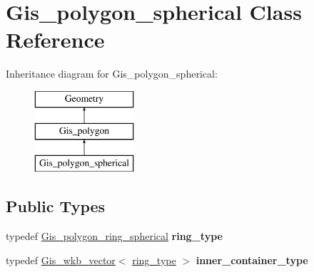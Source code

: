 \hypertarget{classGis__polygon__spherical}{}\section{Gis\+\_\+polygon\+\_\+spherical Class Reference}
\label{classGis__polygon__spherical}
Inheritance diagram for Gis\+\_\+polygon\+\_\+spherical\+:\begin{figure}[H]
\begin{center}
\leavevmode
\includegraphics[height=3.000000cm]{classGis__polygon__spherical}
\end{center}
\end{figure}
\subsection*{Public Types}
\begin{DoxyCompactItemize}
\item 
\mbox{\label{classGis__polygon__spherical_ad2446d2e6b009c57a2354f8ae49c748a}} 
typedef \mbox{\hyperlink{classGis__polygon__ring__spherical}{Gis\+\_\+polygon\+\_\+ring\+\_\+spherical}} {\bfseries ring\+\_\+type}
\item 
\mbox{\label{classGis__polygon__spherical_a1b8290b393b4077f2384932ee98e1a52}} 
typedef \mbox{\hyperlink{classGis__wkb__vector}{Gis\+\_\+wkb\+\_\+vector}}$<$ \mbox{\hyperlink{classGis__polygon__ring__spherical}{ring\+\_\+type}} $>$ {\bfseries inner\+\_\+container\+\_\+type}
\end{DoxyCompactItemize}
